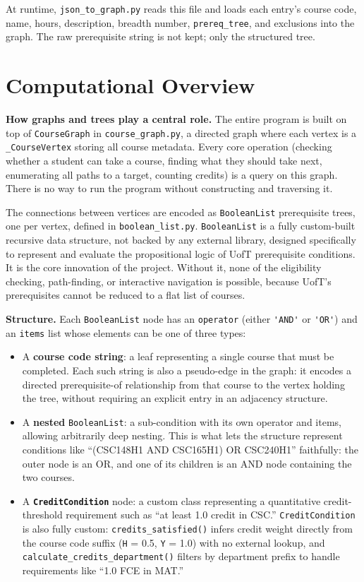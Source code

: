 \documentclass[11pt]{article}
\begin{document}
At runtime, \verb|json_to_graph.py| reads this file and loads each entry's course code,
name, hours, description, breadth number, \verb|prereq_tree|, and exclusions into the graph.
The raw prerequisite string is not kept; only the structured tree.

\section*{Computational Overview}

\textbf{How graphs and trees play a central role.} The entire program is built on top of
\verb|CourseGraph| in \verb|course_graph.py|, a directed graph where each vertex is a
\verb|_CourseVertex| storing all course metadata. Every core operation (checking whether a
student can take a course, finding what they should take next, enumerating all paths to a
target, counting credits) is a query on this graph. There is no way to run the program
without constructing and traversing it.

The connections between vertices are encoded as \verb|BooleanList| prerequisite trees, one
per vertex, defined in \verb|boolean_list.py|. \verb|BooleanList| is a fully custom-built
recursive data structure, not backed by any external library, designed specifically to
represent and evaluate the propositional logic of UofT prerequisite conditions. It is the
core innovation of the project. Without it, none of the eligibility checking, path-finding,
or interactive navigation is possible, because UofT's prerequisites cannot be reduced to a
flat list of courses.

\textbf{Structure.} Each \verb|BooleanList| node has an \verb|operator| (either \verb|'AND'|
or \verb|'OR'|) and an \verb|items| list whose elements can be one of three types:
\begin{itemize}
    \item A \textbf{course code string}: a leaf representing a single course that must
    be completed. Each such string is also a pseudo-edge in the graph: it encodes a directed
    prerequisite-of relationship from that course to the vertex holding the tree, without
    requiring an explicit entry in an adjacency structure.
    \item A \textbf{nested} \verb|BooleanList|: a sub-condition with its own operator and
    items, allowing arbitrarily deep nesting. This is what lets the structure represent
    conditions like ``(CSC148H1 AND CSC165H1) OR CSC240H1'' faithfully: the outer node is an
    OR, and one of its children is an AND node containing the two courses.
    \item A \textbf{\texttt{CreditCondition}} node: a custom class representing a
    quantitative credit-threshold requirement such as ``at least 1.0 credit in CSC.''
    \verb|CreditCondition| is also fully custom: \verb|credits_satisfied()| infers credit
    weight directly from the course code suffix (\verb|H| = 0.5, \verb|Y| = 1.0) with no
    external lookup, and \verb|calculate_credits_department()| filters by department prefix to
    handle requirements like ``1.0 FCE in MAT.''
\end{itemize}
\end{document}
